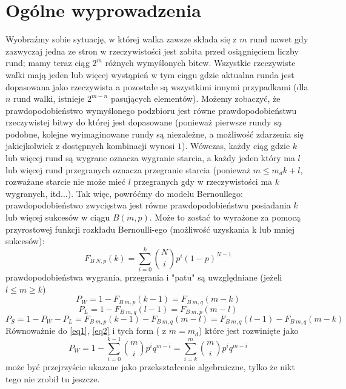 \documentclass{article}
\begin{document}
\section{Ogólne wyprowadzenia}
Wyobraźmy sobie sytuację, w której walka zawsze składa się z $m$ rund nawet gdy zazwyczaj jedna ze stron w rzeczywistości jest zabita przed osiągnięciem liczby rund; mamy teraz ciąg $2^m$ różnych wymyślonych bitew. Wszystkie rzeczywiste walki mają jeden lub więcej wystąpień w tym ciągu gdzie aktualna runda jest dopasowana jako rzeczywista a pozostałe są wszystkimi innymi przypadkami (dla $n$ rund walki, istnieje $2^{m-n}$ pasujących elementów). Możemy zobaczyć, że prawdopodobieństwo wymyślonego podzbioru jest równe prawdopodobieństwu rzeczywistej bitwy do której jest dopasowane (ponieważ pierwsze rundy są podobne, kolejne wyimaginowane rundy są niezależne, a możliwość zdarzenia się jakiejkolwiek z dostępnych kombinacji wynosi $1$). Wówczas, każdy ciąg gdzie $k$ lub więcej rund są wygrane oznacza wygranie starcia, a każdy jeden który ma $l$ lub więcej rund przegranych oznacza przegranie starcia (ponieważ $m\leq m_d k + l$, rozważane starcie nie może mieć $l$ przegranych gdy w rzeczywistości ma $k$ wygranych, itd...). Tak więc, powróćmy do modelu Bernoullego: prawdopodobieństwo zwycięstwa jest równe prawdopodobieństwu posiadania $k$ lub więcej sukcesów w ciągu $B(m,p)$. Może to zostać to wyrażone za pomocą przyrostowej funkcji rozkładu Bernoulli-ego (możliwość uzyskania k lub mniej sukcesów):
\begin{equation*}
    F_{B \ N,p}(k) = \sum^{k}_{i=0}
    \binom{N}{i}p^{i}
    (1-p)^{N-1}
\end{equation*}
prawdopodobieństwa wygrania, przegrania i "patu" są uwzględniane \linebreak(jeżeli
 $l\leq m \geq k$)
 \begin{equation}
 \label{eq1}
     P_W = 1 - F_{B \ m,p} (k-1) = F_{B \ m,q}(m-k)
 \end{equation}
 \begin{equation}
 \label{eq2}
     P_L = 1 - F_{B \ m,q} (l-1) = F_{B \ m,p}(m-l)
 \end{equation}
 \begin{equation*}
     P_S = 1 - P_W - P_L = F_{B \ m,p} (k-1) - F_{B \ m,q} (m-l) =
     F_{B \ m,q} (l-1) - F_{B \ m,q} (m-k)
 \end{equation*}
Równoważnie do \ref{eq1}, \ref{eq2} i tych form ( z $m = m_d$) które jest rozwinięte jako
\begin{equation}
    P_W = 1 - \sum^{k-1}_{i=0} \binom{m}{i}p^{i}q^{m-i} = 
    \sum^{m}_{i=k}\binom{m}{i}p^{i}q^{m-i}
\end{equation}
może być przejrzyście ukazane jako przekształcenie algebraiczne, tylko że nikt tego nie zrobił tu jeszcze.
\end{document}
